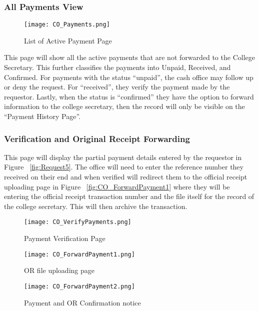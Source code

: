 \subsubsection{All Payments View}

    \begin{figure}[h]
        \centering 
        \begin{minipage}[c]{0.5\linewidth}
            \centering
            \texttt{[image: CO\_Payments.png]}
            \caption{List of Active Payment Page}
            \label{fig:CO_Payments}
        \end{minipage}
    \end{figure}

This page will show all the active payments that are not forwarded to the College Secretary. This further classifies the payments into Unpaid, Received, and Confirmed. For payments with the status “unpaid”, the cash office may follow up or deny the request. For “received”, they verify the payment made by the requestor. Lastly, when the status is “confirmed”  they have the option to forward information to the college secretary, then the record will only be visible on the “Payment History Page”.

\subsubsection{Verification and Original Receipt Forwarding}

This page will display the partial payment details entered by the requestor in Figure ~\ref{fig:Request5}. The office will need to enter the reference number they received on their end and when verified will redirect them to the official receipt uploading page in Figure ~\ref{fig:CO_ForwardPayment1} where they will be entering the official receipt transaction number and the file itself for the record of the college secretary. This will then archive the transaction.

\begin{figure}[h]
    \centering 
    \begin{minipage}[c]{0.5\linewidth}
        \centering
        \texttt{[image: CO\_VerifyPayments.png]}
        \caption{Payment Verification Page}
        \label{fig:CO_VerifyPayments}
    \end{minipage}
\end{figure}

\begin{figure}[h]
    \centering 
    \begin{minipage}[c]{0.5\linewidth}
        \centering
        \texttt{[image: CO\_ForwardPayment1.png]}
        \caption{OR file uploading page}
        \label{fig:CO_ForwardPayment1}
    \end{minipage}\hfill
    \begin{minipage}[c]{0.5\linewidth}
        \centering
        \texttt{[image: CO\_ForwardPayment2.png]}
        \caption{Payment and OR Confirmation notice}
        \label{fig:CO_ForwardPayment2}
    \end{minipage}
\end{figure}

